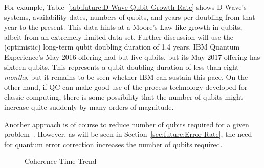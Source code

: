 For example, Table~\ref{tab:future:D-Wave Qubit Growth Rate} shows D-Wave's systems,
availability dates, numbers of qubits, and years per doubling
from that year to the present.
This data hints at a Moore's-Law-like growth in qubits, albeit from
an extremely limited data set.
Further discussion will use the (optimistic) long-term qubit
doubling duration of 1.4 years.
IBM Quantum Experience's May 2016 offering had but five qubits, but its
May 2017 offering has sixteen qubits.
This represents a qubit doubling duration of less than eight \emph{months},
but it remains to be seen whether IBM can sustain this pace.
On the other hand, if QC can make good use of the process technology
developed for classic computing, there is some possibility that the number
of qubits might increase quite suddenly by many orders of magnitude.

Another approach is of course to reduce number of qubits required for a
given problem~\cite{SergeyBravyi2017-QC-SimulateFermionicHamiltonians}.
However, as will be seen in Section~\ref{sec:future:Error Rate}, the need for
quantum error correction increases the number of qubits required.

\begin{figure}[tb]
\centering
{}
\caption{Coherence Time Trend}
\label{fig:future:Coherence Time Trend}
\end{figure}

